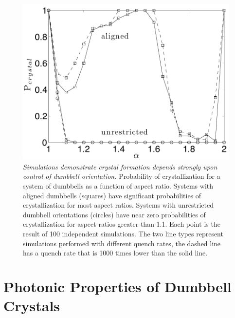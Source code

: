 \begin{figure}[htbp]
\centering
\includegraphics[width=1.0\textwidth]{figures/CFigure4.pdf}
\caption{\label{fig:structure2} \emph{Simulations demonstrate crystal formation depends strongly upon control of dumbbell orientation.}
	Probability of crystallization for a system of dumbbells as a function of aspect ratio. Systems with aligned dumbbells (squares) have significant probabilities of crystallization for most aspect ratios. Systems with unrestricted dumbbell orientations (circles) have near zero probabilities of crystallization for aspect ratios greater than  1.1. Each point is the result of 100 independent simulations. The two line types represent simulations performed with different quench rates, the dashed line has a quench rate that is 1000 times lower than the solid line.}
\end{figure}


\section{Photonic Properties of Dumbbell Crystals}

